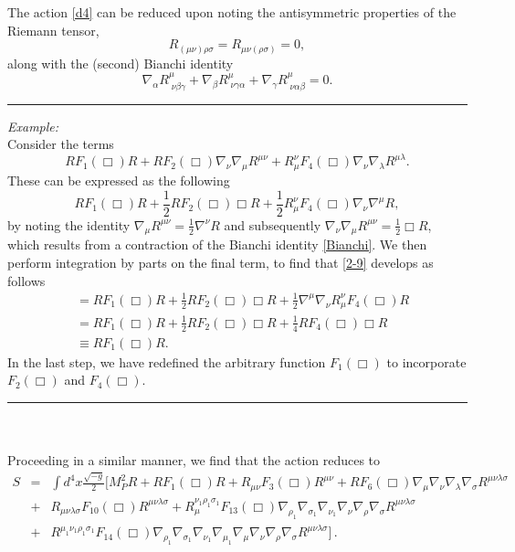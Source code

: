 The action \eqref{d4} can be reduced upon noting the antisymmetric properties of the Riemann tensor,
\[
\label{RiemAnti}
R_{(\mu\nu)\rho\sigma}=R_{\mu\nu(\rho\sigma)}=0,
\]
along with the (second) Bianchi identity
\[
\label{Bianchi}
 \nabla_\alpha R^\mu_{\;\nu\beta\gamma}+\nabla_\beta R^\mu_{\;\nu\gamma\alpha}+\nabla_\gamma R^\mu_{\;\nu\alpha\beta}=0
.\]
\pagebreak

\noindent\rule[0.5ex]{\linewidth}{0.25pt} 
\emph{Example:}\\
Consider the terms
\[
RF_{1}(\Box)R+RF_{2}(\Box)\nabla_{\nu}\nabla_{\mu}R^{\mu\nu}+	R_{\mu}^{\nu}F_{4}(\Box)\nabla_{\nu}\nabla_{\lambda}R^{\mu\lambda}
.\]
These can be expressed as the following
\[
\label{2-9}
RF_{1}(\Box)R+\frac{1}{2}RF_{2}(\Box)\Box R+	\frac{1}{2}R_{\mu}^{\nu}F_{4}(\Box)\nabla_{\nu}\nabla^{\mu}R
,\]
by noting the identity $\nabla_{\mu}R^{\mu\nu}=\frac{1}{2}\nabla^{\nu}R$ and subsequently $\nabla_{\nu}\nabla_{\mu}R^{\mu\nu}=\frac{1}{2}\Box R$, which results from a contraction of the Bianchi identity \eqref{Bianchi}. We then perform integration by parts on the final term, to find that \eqref{2-9} develops as follows
\begin{align}
	&=RF_{1}(\Box)R+\frac{1}{2}RF_{2}(\Box)\Box R+\frac{1}{2}\nabla^{\mu}\nabla_{\nu}R_{\mu}^{\nu}F_{4}(\Box)R
	\\&=RF_{1}(\Box)R+\frac{1}{2}RF_{2}(\Box)\Box R+\frac{1}{4}RF_{4}(\Box)\Box R
	\\&\equiv RF_{1}(\Box)R.
\end{align}
In the last step, we have redefined the arbitrary function $F_{1}(\Box)$ to incorporate $F_{2}(\Box)$ and $F_{4}(\Box)$. \\
\noindent\rule[0.5ex]{\linewidth}{0.25pt} 
\\\\
Proceeding in a similar manner, we find that the action reduces to 
\begin{eqnarray} 
S&=&\int d^4x\frac{\sqrt{-g}}{2}\Big[M_P^2 R+R F_1(\Box)R + R_{\mu\nu} F_3(\Box)R^{\mu\nu}
+ R F_6(\Box)\nabla_{\mu}\nabla_{\nu}\nabla_{\lambda}\nabla_{\sigma}R^{\mu\nu\lambda\sigma} \nonumber \\
& + & R_{\mu\nu\lambda\sigma} F_{10}(\Box)R^{\mu\nu\lambda\sigma}  +
R_{\mu}^{\nu_1\rho_1\sigma_1}F_{13}(\Box)\nabla_{\rho_1}\nabla_{\sigma_1}\nabla_{\nu_1}\nabla_{\nu}\nabla_{\rho}\nabla_{\sigma}R^{\mu\nu\lambda\sigma} \nonumber \\ 
& + & R^{\mu_1\nu_1\rho_1\sigma_1} F_{14}(\Box)\nabla_{\rho_1}\nabla_{\sigma_1}
\nabla_{\nu_1}\nabla_{\mu_1}\nabla_{\mu}\nabla_{\nu}\nabla_{\rho}\nabla_{\sigma}R^{\mu\nu\lambda\sigma}\Big]\,.
\label{d5}\end{eqnarray}
